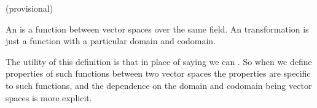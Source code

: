 
\sbasic

















\sstart
{}


(provisional)

An  is a function between vector spaces over the same field.
An transformation is just a function with a particular domain and codomain.

The utility of this definition is that in place of saying  we can .
So when we define properties of such functions between two vector spaces the properties are specific to such functions, and the dependence on the domain and codomain being vector spaces is more explicit.
\strats
